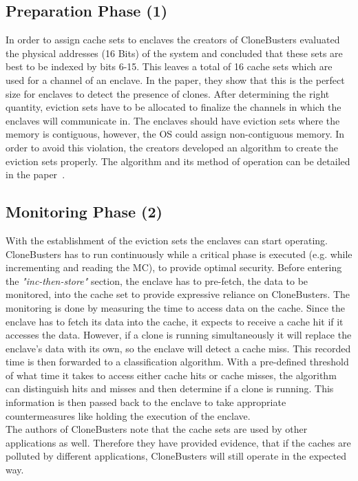 \subsection{Preparation Phase (1)}
In order to assign cache sets to enclaves the creators of CloneBusters evaluated the physical addresses (16 Bits) of the system and concluded that these sets are best to be indexed by bits 6-15. This leaves a total of 16 cache sets which are used for a channel of an enclave. In the paper, they show that this is the perfect size for enclaves to detect the presence of clones. 
After determining the right quantity, eviction sets have to be allocated to finalize the channels in which the enclaves will communicate in. The enclaves should have eviction sets where the memory is contiguous, however, the OS could assign non-contiguous memory. In order to avoid this violation, the creators developed an algorithm to create the eviction sets properly. The algorithm and its method of operation can be detailed in the paper~\cite{nfw}.

\subsection{Monitoring Phase (2)}
With the establishment of the eviction sets the enclaves can start operating. CloneBusters has to run continuously while a critical phase is executed (e.g. while incrementing and reading the MC), to provide optimal security. Before entering the \textit{"inc-then-store"} section, the enclave has to pre-fetch, the data to be monitored, into the cache set to provide expressive reliance on CloneBusters. 
The monitoring is done by measuring the time to access data on the cache. 
Since the enclave has to fetch its data into the cache, it expects to receive a cache hit if it accesses the data. However, if a clone is running simultaneously it will replace the enclave's data with its own, so the enclave will detect a cache miss. This recorded time is then forwarded to a classification algorithm. With a pre-defined threshold of what time it takes to access either cache hits or cache misses, the algorithm can distinguish hits and misses and then determine if a clone is running. This information is then passed back to the enclave to take appropriate countermeasures like holding the execution of the enclave.\\
The authors of CloneBusters note that the cache sets are used by other applications as well. Therefore they have provided evidence, that if the caches are polluted by different applications, CloneBusters will still operate in the expected way.